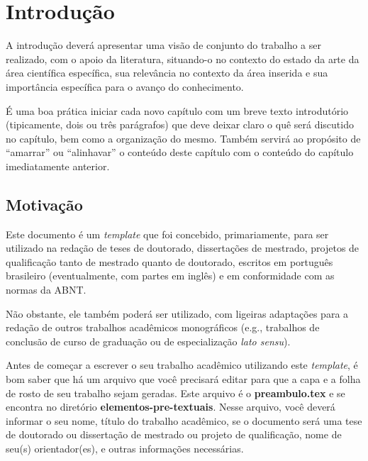 
\chapter{Introdução}
\label{chap_introducao}

A introdução deverá apresentar uma visão de conjunto do trabalho a ser realizado, com o apoio da literatura, situando-o no contexto do estado da arte da área científica específica, sua relevância no contexto da área inserida e sua importância específica para o avanço do conhecimento.

É uma boa prática iniciar cada novo capítulo com um breve texto introdutório (tipicamente, dois ou três parágrafos) que deve deixar claro o quê será discutido no capítulo, bem como a organização do mesmo.
Também servirá ao propósito de ``amarrar'' ou ``alinhavar'' o conteúdo deste capítulo com o conteúdo do capítulo imediatamente anterior.

\section{Motivação}
\label{sec_motivacao}

Este documento é um \emph{template} que foi concebido, primariamente, para ser utilizado na redação de teses de doutorado, dissertações de mestrado, projetos de qualificação tanto de mestrado quanto de doutorado, escritos em português brasileiro (eventualmente, com partes em inglês) e em conformidade com as normas da ABNT.

Não obstante, ele também poderá ser utilizado, com ligeiras adaptações para a redação de outros trabalhos acadêmicos monográficos (e.g., trabalhos de conclusão de curso de graduação ou de especialização \emph{lato sensu}).

Antes de começar a escrever o seu trabalho acadêmico utilizando este \emph{template}, é bom saber que há um arquivo que você precisará editar para que a capa e a folha de rosto de seu trabalho sejam geradas.
Este arquivo é o \textbf{preambulo.tex} e se encontra no diretório \textbf{elementos-pre-textuais}.
Nesse arquivo, você deverá informar o seu nome, título do trabalho acadêmico, se o documento será uma tese de doutorado ou dissertação de mestrado ou projeto de qualificação, nome de seu(s) orientador(es), e outras informações necessárias.

